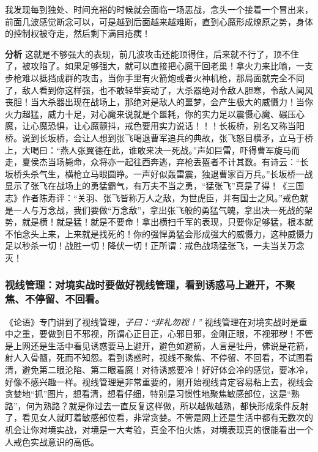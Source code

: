 \begin{case}[做好慎独]
    我发现每到独处、时间充裕的时候就会面临一场恶战，念头一个接着一个冒出来，前面几波感觉断念可以，可是越到后面越来越难断，直到心魔形成燎原之势，身体的控制权被夺走，然后剩下满目疮痍！

    \textbf{分析} 这就是不够强大的表现，前几波攻击还能顶得住，后来就不行了，顶不住了，被攻陷了。如果足够强大，就可以直接把心魔干回老巢！拿火力来比喻，一支步枪难以抵挡成群的攻击，当你手里有火箭炮或者火神机枪，那局面就完全不同了，敌人看到你这样强，也不敢轻举妄动了，大杀器绝对令敌人胆寒，令敌人闻风丧胆！当大杀器出现在战场上，那绝对是敌人的噩梦，会产生极大的威慑力！当你火力超猛，威力十足，对心魔来说就是个噩耗，你的实力足以震慑心魔、碾压心魔，让心魔恐惧，让心魔颤抖，戒色要用实力说话！！！长板桥，别名又称当阳桥。说到长坂桥，会让人想到张飞喝退曹军追兵的典故，张飞怒目横矛，立马于桥上，大喝曰：“燕人张翼德在此，谁敢来决一死战。”声如巨雷，吓得曹军旋马而走，夏侯杰当场毙命，众将亦一起往西奔逃，弃枪丢盔者不计其数。有诗云：“长坂桥头杀气生，横枪立马眼圆睁。一声好似轰雷震，独退曹家百万兵。”长坂桥一战显示了张飞在战场上的勇猛霸气，有万夫不当之勇，“猛张飞”真是了得！《三国志》作者陈寿评：“关羽、张飞皆称万人之敌，为世虎臣，并有国士之风。”戒色就是一人与万念战，我们要做“万念敌”，拿出张飞般的勇猛气魄，拿出决一死战的架势，就是横！就是猛！就是不要命！拿出横扫千军的表现，只要你足够猛，根本就不怕念头上来，上来就是找死的！你的强悍勇猛会形成强大的威慑力，这种威慑力足以秒杀一切！战胜一切！降伏一切！正所谓：戒色战场猛张飞，一夫当关万念灭！
\end{case}

\subsubsection{视线管理：对境实战时要做好视线管理，看到诱惑马上避开，不聚焦、不停留、不回看。}

《论语》专门讲到了视线管理，\textit{子曰：“非礼勿视！”} 视线管理在对境实战时是重中之重，要做到目不邪视，所谓心正目正，心邪目邪，金刚正眼，不视邪秽！不管是上网还是生活中看见诱惑要马上避开，避色如避箭，人言是牡丹，佛说是花箭，射人入骨髓，死而不知怨。看到诱惑时，视线不聚焦、不停留、不回看，不试图看清，避免第二眼沦陷、第二眼着魔！对待诱惑要冷！好好体会冷的感觉，要冰冷，好像不感兴趣一样。视线管理是非常重要的，刚开始视线肯定容易粘上去，视线会贪婪地“抓”图片，想看清，想看仔细，特别是习惯性地聚焦敏感部位，这是“熟路”，何为熟路？就是你过去一直反复这样做，所以越做越熟，都快形成条件反射了，看见女人就盯着敏感部位看，非常贪婪。不管是网上还是生活中都有无数次的机会让你对境实战，对境是一大考验，真金不怕火炼，对境表现真的很能看出一个人戒色实战意识的高低。

